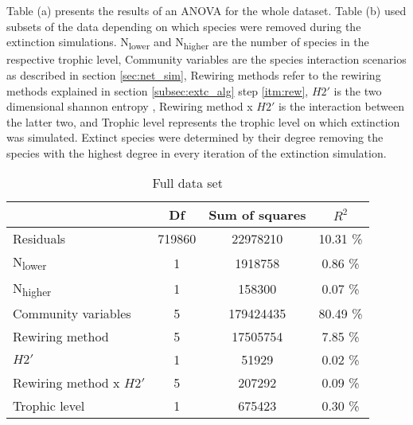 \documentclass[12pt,a4paper]{article}
\begin{document}
\begin{table}[H]
\centering
\captionsetup{width = \linewidth}
\caption[ANOVA results]{Table (a) presents the results of an ANOVA for the whole dataset. Table (b) used subsets of the data depending on which species were removed during the extinction simulations. N\textsubscript{lower} and N\textsubscript{higher} are the number of species in the respective trophic level, Community variables are the species interaction scenarios as described in section \ref{sec:net_sim}, Rewiring methods refer to the rewiring methods explained in section \ref{subsec:extc_alg} step \ref{itm:rew}, $H2'$ is the two dimensional shannon entropy \parencite{Bluethgen2006}, Rewiring method x $H2'$ is the interaction between the latter two, and Trophic level represents the trophic level on which extinction was simulated. Extinct species were determined by their degree removing the species with the highest degree in every iteration of the extinction simulation.}
\begin{subtable}{\linewidth}
\caption{Full data set}
\label{tab:anova_full_deg}
\begin{tabularx}{\linewidth}{@{} X *3{c} @{}}
\toprule
  						& Df 	& Sum of squares	& $R^2$ 		\\ \midrule
Residuals 				& 719860 & 22978210 	& 10.31 \% 	\\ 
N\textsubscript{lower} 	& 1 & 1918758 		& 0.86 \% 	\\
N\textsubscript{higher} 	& 1 & 158300 		& 0.07 \% 	\\
Community variables 		& 5 & 179424435 		& 80.49 \% 	\\
Rewiring method 			& 5 & 17505754 		& 7.85 \% 	\\ 
$H2'$ 					& 1 & 51929			& 0.02 \% 	\\
Rewiring method x $H2'$ 	& 5 & 207292 		& 0.09 \% 	\\ 
Trophic level 			& 1 & 675423 		& 0.30 \%  \\ \bottomrule
\end{tabularx}
\end{subtable}
\medskip



\end{table}
\end{document}
